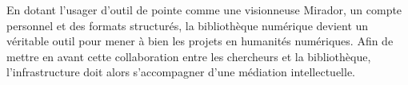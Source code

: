 En dotant l'usager d'outil de pointe comme une visionneuse Mirador, un compte personnel et des formats structurés, la bibliothèque numérique devient un véritable outil pour mener à bien les projets en humanités numériques. Afin de mettre en avant cette collaboration entre les chercheurs et la bibliothèque, l'infrastructure doit alors s'accompagner d'une médiation intellectuelle. 
